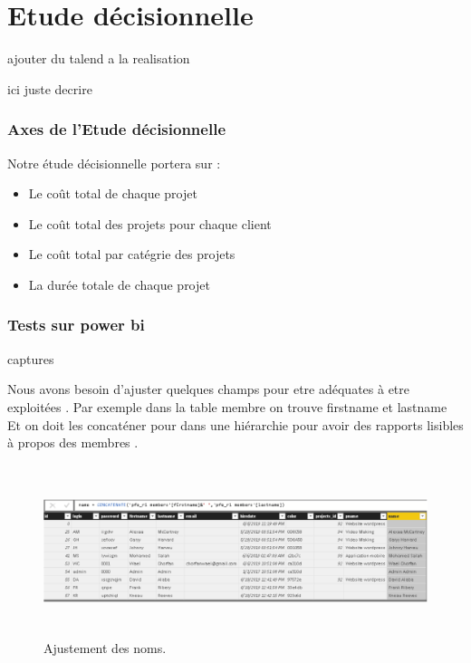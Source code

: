 \chapter{Etude  d\'{e}cisionnelle}


ajouter du talend a la realisation

ici juste decrire
\subsection{Axes de l'Etude d\'{e}cisionnelle }

\bigskip
Notre \'{e}tude d\'{e}cisionnelle portera sur :

\begin{itemize}
\item{Le co\^{u}t total de chaque projet}
\item{Le co\^{u}t total des projets pour chaque client}
\item{Le co\^{u}t  total par catégrie des projets }
\item{La dur\'{e}e totale de chaque projet}
\end{itemize}





\subsection{Tests sur power bi }
captures


Nous avons besoin d'ajuster quelques champs pour etre ad\'{e}quates \`{a} etre
exploit\'{e}es .
Par exemple dans la table membre on trouve \guillemotleft{} firstname \guillemotright{} et \guillemotleft{} lastname \guillemotright{}
Et on doit les concat\'{e}ner pour dans une hi\'{e}rarchie pour avoir des rapports
lisibles \`{a} propos des membres .



\FloatBarrier
\begin{figure}[H]
\center
\includegraphics[width=14cm,height=5cm]{./figures/pb1.png}
\caption{Ajustement des noms.}
\end{figure}
\FloatBarrier



